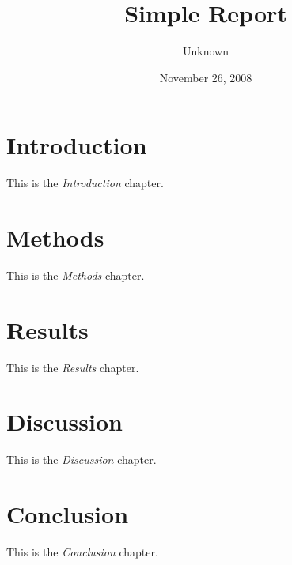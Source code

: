 \documentclass[a4paper]{report}
\title{\textbf {Simple Report}}
\author{Unknown}
\date{November 26, 2008}
\begin{document}
    \maketitle
    \tableofcontents
        \chapter{Introduction}
        This is the \textit{Introduction} chapter.
        
        \chapter{Methods}
        This is the \textit{Methods} chapter.
        
        \chapter{Results}
        This is the \textit{Results} chapter.
        
        \chapter{Discussion}
        This is the \textit{Discussion} chapter.
        
        \chapter{Conclusion}
        This is the \textit{Conclusion} chapter.
\end{document}
